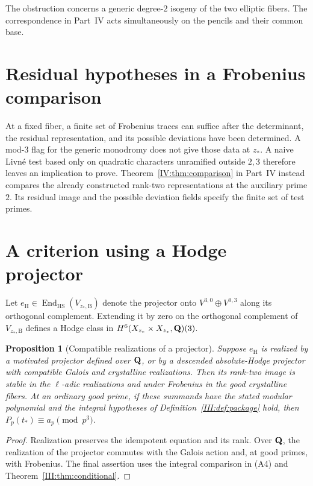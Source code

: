 \documentclass[11pt,letterpaper]{article}
\newtheorem{proposition}[theorem]{Proposition}
\theoremstyle{definition}
\theoremstyle{remark}
\begin{document}
The obstruction concerns a generic degree-$2$ isogeny of the two elliptic fibers.
The correspondence in Part~IV acts simultaneously on the pencils and their common base.


\section{Residual hypotheses in a Frobenius comparison}

At a fixed fiber, a finite set of Frobenius traces can suffice after
the determinant, the residual representation, and its possible
deviations have been determined. A mod-$3$ flag for the generic
monodromy does not give those data at $z_*$. A naive Livn\'e test
based only on quadratic characters unramified outside $2,3$ therefore
leaves an implication to prove. Theorem~\ref{IV:thm:comparison} in
Part~IV instead compares the already constructed rank-two
representations at the auxiliary prime $2$. Its residual image and the
possible deviation fields specify the finite set of test primes.

\section{A criterion using a Hodge projector}

Let $e_{\mathrm H}\in\operatorname{End}_{\mathrm{HS}}(V_{z_*,\mathrm B})$
denote the projector onto $V^{3,0}\oplus V^{0,3}$ along its
orthogonal complement. Extending it by zero on the orthogonal
complement of $V_{z_*,\mathrm B}$ defines a Hodge class in
$H^6(X_{z_*}\times X_{z_*},\mathbf Q)(3)$.

\begin{proposition}[Compatible realizations of a projector]\label{III:prop:absolute}
Suppose $e_{\mathrm H}$ is realized by a motivated projector
defined over $\mathbf Q$, or by a descended absolute-Hodge projector with
compatible Galois and crystalline realizations. Then its rank-two
image is stable in the $\ell$-adic realizations and under Frobenius
in the good crystalline fibers. At an ordinary good prime, if these
summands have the stated modular polynomial and the integral
hypotheses of Definition~\ref{III:def:package} hold, then
$P_p(t_*)\equiv a_p\pmod{p^3}$.
\end{proposition}

\begin{proof}
Realization preserves the idempotent equation and its rank. Over
$\mathbf Q$, the realization of the projector commutes with the Galois
action and, at good primes, with Frobenius. The final assertion
uses the integral comparison in (A4) and
Theorem~\ref{III:thm:conditional}.
\end{proof}
\end{document}
